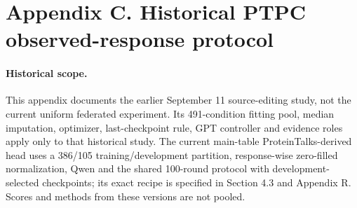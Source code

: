
\section*{Appendix C. Historical PTPC observed-response protocol}
\label{app:ptpc-protocol}

\paragraph{Historical scope.}
This appendix documents the earlier September 11 source-editing study, not the current uniform federated experiment. Its 491-condition fitting pool, median imputation, optimizer, last-checkpoint rule, GPT controller and evidence roles apply only to that historical study. The current main-table ProteinTalks-derived head uses a 386/105 training/development partition, response-wise zero-filled normalization, Qwen and the shared 100-round protocol with development-selected checkpoints; its exact recipe is specified in Section 4.3 and Appendix R. Scores and methods from these versions are not pooled.

